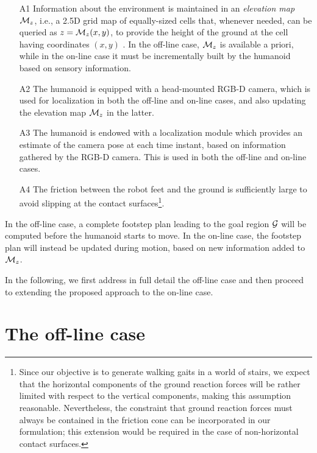 \begin{itemize}

\item[A1] Information about the environment is maintained in an {\em elevation map} ${\cal M}_{z}$, i.e., a 2.5D grid map of equally-sized cells that, whenever needed, can be queried as $z = {\cal M}_{z}(x,y)$, to provide the height of the ground at the cell having coordinates $(x,y)$ \cite{BuHeBe:16}.
In the off-line case, ${\cal M}_{z}$ is available a priori, while in the on-line case it must be incrementally built by the humanoid based on sensory information. 
    
\item[A2] The humanoid is equipped with a head-mounted RGB-D camera, which is used for localization in both the off-line and on-line cases, and also updating the elevation map ${\cal M}_{z}$ in the latter.
    
\item[A3] The humanoid is endowed with a localization module which provides an estimate of the camera pose at each time instant, based on information gathered by the RGB-D camera. This is used in both the off-line and on-line cases.

\item[A4] The friction between the robot feet and the ground is sufficiently large to avoid slipping at the contact surfaces\footnote{Since our objective is to generate walking gaits in a world of stairs, we expect that the horizontal components of the ground reaction forces will be rather limited with respect to the vertical components, making this assumption reasonable. Nevertheless, the constraint that ground reaction forces must always be contained in the friction cone can be incorporated in our formulation; this extension would be required in the case of non-horizontal contact surfaces.}.

\end{itemize}

In the off-line case, a complete footstep plan leading to the goal region $\cal G$ will be computed before the humanoid starts to move. In the on-line case, the footstep plan will instead be updated during motion, based on new information added to ${\cal M}_{z}$. 

In the following, we first address in full detail the off-line case and then proceed to extending the proposed approach to the on-line case.

\section{The off-line case} 
\label{sec:WoS:offlineCase}


